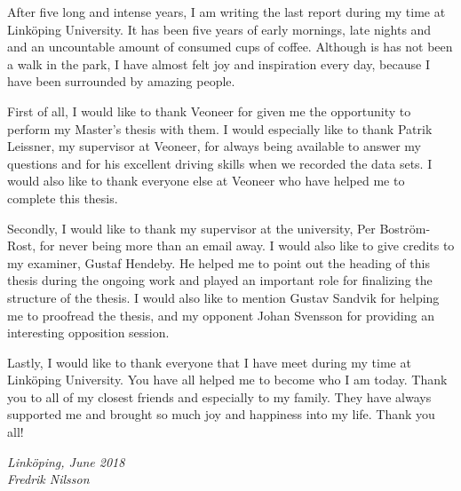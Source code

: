 \begin{acknowledgments}
After five long and intense years, I am writing the last report during my time at Link\"oping University.
It has been five years of early mornings, late nights and and an uncountable amount of consumed cups of coffee.
Although is has not been a walk in the park, I have almost felt joy and inspiration every day, because I have been surrounded by amazing people.

First of all, I would like to thank Veoneer for given me the opportunity to perform my Master's thesis with them.
I would especially like to thank Patrik Leissner, my supervisor at Veoneer, for always being available to answer my questions and for his excellent driving skills when we recorded the data sets.
I would also like to thank everyone else at Veoneer who have helped me to complete this thesis.

Secondly, I would like to thank my supervisor at the university, Per Bostr\"om-Rost, for never being more than an email away.
I would also like to give credits to my examiner, Gustaf Hendeby.
He helped me to point out the heading of this thesis during the ongoing work and played an important role for finalizing the structure of the thesis.
I would also like to mention Gustav Sandvik for helping me to proofread the thesis, and my opponent Johan Svensson for providing an interesting opposition session.

Lastly, I would like to thank everyone that I have meet during my time at Link\"oping University.
You have all helped me to become who I am today.
Thank you to all of my closest friends and especially to my family.
They have always supported me and brought so much joy and happiness into my life.
Thank you all!

  \addvspace{1em}
  \begin{flushright}
    \textit{%
      Linköping, June 2018\\
      Fredrik Nilsson%
    }
  \end{flushright}
\end{acknowledgments}

